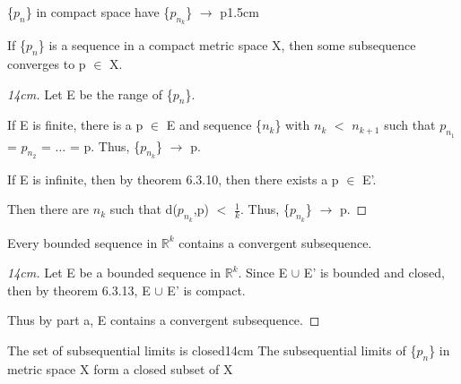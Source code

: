     \begin{ltheorem}{\{$p_n$\} in compact space have
    \{$p_{n_k}$\} $\rightarrow$ p}{1.5cm}
        \item If \{$p_n$\} is a sequence in a compact metric space X,
            then some subsequence converges to p $\in$ X.

            \begin{proof}[14cm]
                Let E be the range of \{$p_n$\}.

                If E is finite, there is a p $\in$ E and sequence
                \{$n_k$\} with $n_k$ $<$ $n_{k+1}$ such that
                $p_{n_1}$ = $p_{n_2}$ = ... = p.
                Thus, \{$p_{n_k}$\} $\rightarrow$ p.

                If E is infinite, then by {\color{red} theorem 6.3.10},
                then there exists a p $\in$ E'.

                Then there are $n_k$ such that d($p_{n_k}$,p) $<$ $\frac{1}{k}$.
                Thus, \{$p_{n_k}$\} $\rightarrow$ p.                
            \end{proof}

        \item Every bounded sequence in $\mathbb{R}^k$ contains
            a convergent subsequence.

            \begin{proof}[14cm]
                Let E be a bounded sequence in $\mathbb{R}^k$.
                Since E $\cup$ E' is bounded and closed, then by
                {\color{red} theorem 6.3.13}, E $\cup$ E' is compact.
                
                Thus by part a, E contains a convergent subsequence.
            \end{proof}
    \end{ltheorem}

    \vspace{0.5cm}



    \begin{wtheorem}{The set of subsequential limits is closed}{14cm}
        The subsequential limits of \{$p_n$\} in metric space X form
        a closed subset of X
    \end{wtheorem}
    
